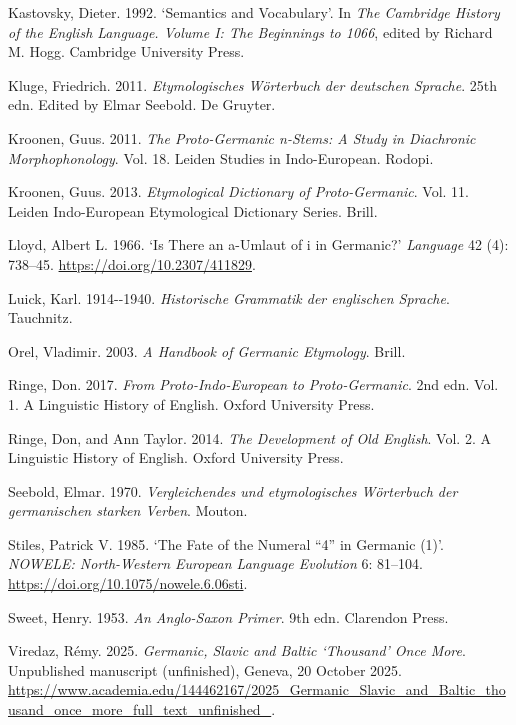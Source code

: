 \documentclass[
  british,
  a4paper,
]{article}
\newlength{\cslhangindent}
\newenvironment{CSLReferences}[2] %
 {\begin{list}{}{%
  \setlength{\itemindent}{0pt}
  \setlength{\leftmargin}{0pt}
  \setlength{\parsep}{0pt}
  \ifodd #1
   \setlength{\leftmargin}{\cslhangindent}
   \setlength{\itemindent}{-1\cslhangindent}
  \fi
  \setlength{\itemsep}{#2\baselineskip}}}
 {\end{list}}
\begin{document}
\begin{CSLReferences}{1}{1}
Kastovsky, Dieter. 1992. {`Semantics and Vocabulary'}. In \emph{The
{Cambridge} History of the {English} Language. Volume {I}: The
Beginnings to 1066}, edited by Richard M. Hogg. Cambridge University
Press.

Kluge, Friedrich. 2011. \emph{{Etymologisches W{ö}rterbuch der deutschen
Sprache}}. 25th edn. Edited by Elmar Seebold. De Gruyter.

Kroonen, Guus. 2011. \emph{The {Proto-Germanic} n-Stems: A Study in
Diachronic Morphophonology}. Vol. 18. Leiden Studies in Indo-European.
Rodopi.

Kroonen, Guus. 2013. \emph{Etymological Dictionary of {Proto-Germanic}}.
Vol. 11. Leiden Indo-European Etymological Dictionary Series. Brill.

Lloyd, Albert L. 1966. {`Is There an {a-}Umlaut of {i} in {Germanic}?'}
\emph{Language} 42 (4): 738--45. \url{https://doi.org/10.2307/411829}.

Luick, Karl. 1914-\/-1940. \emph{{Historische Grammatik der englischen
Sprache}}. Tauchnitz.

Orel, Vladimir. 2003. \emph{A Handbook of {Germanic} Etymology}. Brill.

Ringe, Don. 2017. \emph{From {Proto-Indo-European} to {Proto-Germanic}}.
2nd edn. Vol. 1. A Linguistic History of English. Oxford University
Press.

Ringe, Don, and Ann Taylor. 2014. \emph{The Development of {Old
English}}. Vol. 2. A Linguistic History of English. Oxford University
Press.

Seebold, Elmar. 1970. \emph{{Vergleichendes und etymologisches
W{ö}rterbuch der germanischen starken Verben}}. Mouton.

Stiles, Patrick V. 1985. {`The Fate of the Numeral {``4''} in Germanic
(1)'}. \emph{NOWELE: North-Western European Language Evolution} 6:
81--104. \url{https://doi.org/10.1075/nowele.6.06sti}.

Sweet, Henry. 1953. \emph{An {Anglo-Saxon} Primer}. 9th edn. Clarendon
Press.

Viredaz, Rémy. 2025. \emph{{Germanic}, {Slavic} and {Baltic}
{`Thousand'} Once More}. Unpublished manuscript (unfinished), Geneva, 20
October 2025.
\url{https://www.academia.edu/144462167/2025_Germanic_Slavic_and_Baltic_thousand_once_more_full_text_unfinished_}.

\end{CSLReferences}
\end{document}
